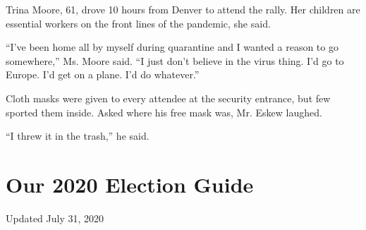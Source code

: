 Trina Moore, 61, drove 10 hours from Denver to attend the rally. Her
children are essential workers on the front lines of the pandemic, she
said.

``I've been home all by myself during quarantine and I wanted a reason
to go somewhere,'' Ms. Moore said. ``I just don't believe in the virus
thing. I'd go to Europe. I'd get on a plane. I'd do whatever.''

Cloth masks were given to every attendee at the security entrance, but
few sported them inside. Asked where his free mask was, Mr. Eskew
laughed.

``I threw it in the trash,'' he said.

\hypertarget{our-2020-election-guide}{%
\section{Our 2020 Election Guide}\label{our-2020-election-guide}}

Updated July 31, 2020

